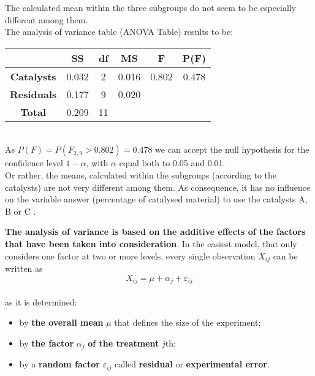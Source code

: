 \begin{frame}
  \begin{small}
    \vspace*{.25cm} 
    The calculated mean within the three subgroups do not seem to be especially different among them.\\
    The analysis of variance table (ANOVA Table) results to be:\\
    \vspace*{.5cm}
    \hspace*{.75cm}
    \begin{tabular}{|c|c|c|c|c|c|}
      \cline{2-6}
      \multicolumn{1}{c|}{\hspace*{3.5cm}}  & \textbf{SS}  & \textbf{df} & \textbf{MS}  & \textbf{F}  &  \textbf{P(F)} \\ \hline
      \textbf{Catalysts}  & 0.032  & 2  &  0.016 &  0.802 & 0.478 \\ \hline
      \textbf{Residuals}  &  0.177 & 9  & 0.020  &   &   \\ \hline
      \textbf{Total}  & 0.209  & 11  &   &   &   \\ \hline
    \end{tabular}\\
    \vspace*{.5cm}
    As $ P(F) = P(F_{2, 9} > 0.802) = 0.478 $ we can accept the null hypothesis for the confidence level  {\boldmath$1-\alpha$}, with {\boldmath$\alpha$} equal both to 0.05 and 0.01.\\
    \vspace*{.25cm}
    Or rather, the means, calculated within the subgroups (according to the catalysts) are not very different among them. As consequence, it has no influence on the variable answer (percentage of catalysed material) to use the catalysts A, B or C  .
  \end{small}
\end{frame}


\begin{frame}
  \vspace*{.25cm} 
  \textbf{The analysis of variance is based on the additive effects of the factors that have been taken into consideration}. In the easiest model, that only considers one factor at two or more levels, every single observation {\boldmath$X_{ij}$} can be written as
  $$ X_{ij} = \mu + \alpha_j + \varepsilon_{ij} $$\\
  \vspace*{.15cm}
  as it is determined:
  \begin{itemize}
    \item by \textbf{the overall mean} {\boldmath$\mu$} that defines the size of the experiment;
    \item by \textbf{the factor} {\boldmath$\alpha_j$} \textbf{of the treatment} $ j $th;
    \item by a \textbf{random factor}  {\boldmath$\varepsilon_{ij}$} called \textbf{residual} or \textbf{experimental error}.
  \end{itemize}
\end{frame}

